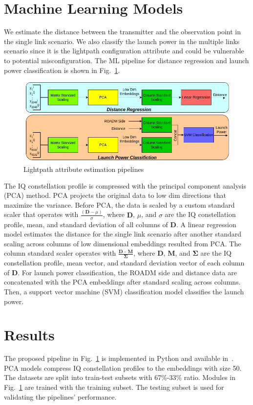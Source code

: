 \documentclass[lettersize,journal, one-column]{IEEEtran}
\begin{document}
\section{Machine Learning Models}
\label{section:ml_models}
We estimate the distance between the transmitter and the observation point in the single link scenario.
We also classify the launch power in the multiple links scenario since it is the lightpath configuration attribute and could be vulnerable to potential misconfiguration.
The ML pipeline for distance regression and launch power classification is shown in Fig.~\ref{figure:models}.
\begin{figure}
	\centering
    \includegraphics[width=\columnwidth]{figures/models.png}
    \caption{Lightpath attribute estimation pipelines}
	\label{figure:models}
\end{figure}
The IQ constellation profile is compressed with the principal component analysis (PCA) method.
PCA projects the original data to low dim directions that maximize the variance.
Before PCA, the data is scaled by a custom standard scaler that operates with $\frac{(\textbf{D}-\mu)}{\sigma}$, where $\textbf{D}$, $\mu$, and $\sigma$ are the IQ constellation profile, mean, and standard deviation of all columns of $\textbf{D}$.
A linear regression model estimates the distance for the single link scenario after another standard scaling across columns of low dimensional embeddings resulted from PCA.
The column standard scaler operates with $\frac{\textbf{D - M}}{\mathbf{\Sigma}}$, where $\textbf{D}$, $\textbf{M}$, and $\mathbf{\Sigma}$ are the IQ constellation profile, mean vector, and standard deviation vector of each column of $\textbf{D}$.
For launch power classification, the ROADM side and distance data are concatenated with the PCA embeddings after standard scaling across columns.
Then, a support vector machine (SVM) classification model classifies the launch power.

\section{Results}
\label{section:results}
The proposed pipeline in Fig.~\ref{figure:models} is implemented in Python and available in~\cite{code}.
PCA models compress IQ constellation profiles to the embeddings with size 50.
The datasets are split into train-test subsets with 67\%-33\% ratio.
Modules in Fig.~\ref{figure:models} are trained with the training subset.
The testing subset is used for validating the pipelines' performance.
\end{document}
